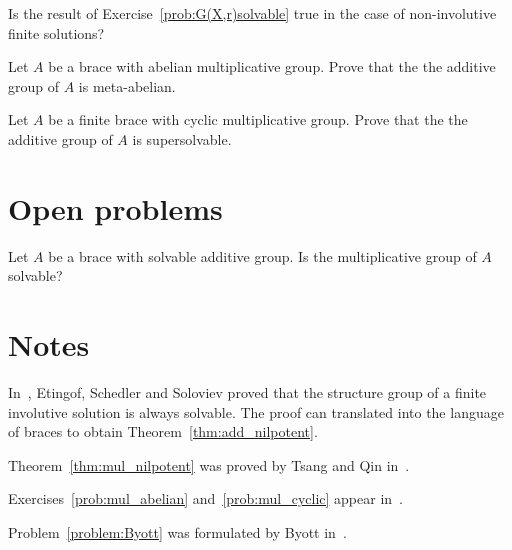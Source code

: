 \begin{prob}
Is the result of Exercise~\ref{prob:G(X,r)solvable} true in the case of non-involutive finite solutions?
\end{prob}

\begin{prob}
\label{prob:mul_abelian}
Let $A$ be a brace with abelian multiplicative group. Prove that the 
the additive group of $A$ is meta-abelian. 
\end{prob}

\begin{prob}
\label{prob:mul_cyclic}
Let $A$ be a finite brace with cyclic multiplicative group. Prove that the 
the additive group of $A$ is supersolvable. 
\end{prob}

\section*{Open problems}

\begin{problem}
\label{problem:Byott}
    Let $A$ be a brace with solvable additive group. Is the 
    multiplicative group of $A$ solvable?
\end{problem}

\section*{Notes}

In~\cite{MR1722951}, Etingof, Schedler and Soloviev proved that the structure group of a finite involutive
solution is always solvable. The proof can translated into the language of braces 
to obtain Theorem~\ref{thm:add_nilpotent}.

Theorem~\ref{thm:mul_nilpotent} was proved by Tsang and Qin in~\cite{MR4077413}. 


Exercises~\ref{prob:mul_abelian} and~\ref{prob:mul_cyclic} appear in~\cite{MR4077413}.

Problem~\ref{problem:Byott} was formulated by Byott in~\cite{MR3425626}.

